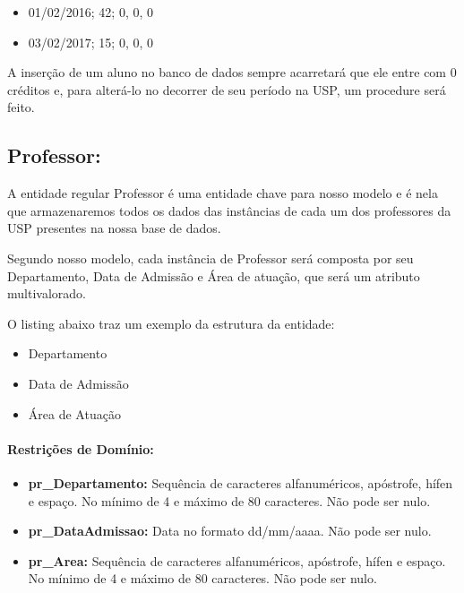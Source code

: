 \documentclass{report}
\begin{document}
\begin{itemize}
  \item 01/02/2016; 42; 0, 0, 0
  \item 03/02/2017; 15; 0, 0, 0
\end{itemize}

A inserção de um aluno no banco de dados sempre acarretará que ele entre com 0 créditos e, para alterá-lo no decorrer de seu período na USP, um procedure será feito.
\subsection{Professor:}
  A entidade regular Professor é uma entidade chave para nosso modelo e é nela que armazenaremos todos os dados das instâncias de cada um dos professores da USP presentes na nossa base de dados.
  
  Segundo nosso modelo, cada instância de Professor será composta por seu Departamento, Data de Admissão e Área de atuação, que será um atributo multivalorado.
  
  O listing abaixo traz um exemplo da estrutura da entidade:
\begin{itemize}
  \item Departamento
  \item Data de Admissão
  \item Área de Atuação
\end{itemize}
\paragraph{Restrições de Domínio:}
\begin{itemize}
  \item \textbf{pr\_Departamento:} Sequência de caracteres alfanuméricos, apóstrofe, hífen e espaço. No mínimo de 4 e máximo de 80 caracteres. Não pode ser nulo.
  \item \textbf{pr\_DataAdmissao:} Data no formato dd/mm/aaaa. Não pode ser nulo.
  \item \textbf{pr\_Area:} Sequência de caracteres alfanuméricos, apóstrofe, hífen e espaço. No mínimo de 4 e máximo de 80 caracteres. Não pode ser nulo.
\end{itemize}
\end{document}
